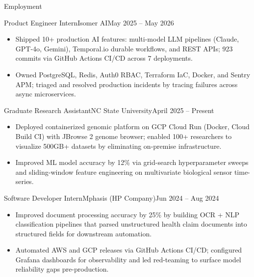 \documentclass[]{mcdowellcv}
\begin{document}
\makeheader

\begin{cvsection}{Employment}
  \begin{cvsubsection}{Product Engineer Intern}{Isomer AI}{May 2025 -- May 2026}
    \begin{itemize}
      \item Shipped 10+ production AI features: multi-model LLM pipelines (Claude, GPT-4o, Gemini), Temporal.io durable workflows, and REST APIs; 923 commits via GitHub Actions CI/CD across 7 deployments.
      \item Owned PostgreSQL, Redis, Auth0 RBAC, Terraform IaC, Docker, and Sentry APM; triaged and resolved production incidents by tracing failures across async microservices.
    \end{itemize}
    \vspace{-1.5pt}
  \end{cvsubsection}

  \begin{cvsubsection}{Graduate Research Assistant}{NC State University}{April 2025 -- Present}
    \begin{itemize}
      \item Deployed containerized genomic platform on GCP Cloud Run (Docker, Cloud Build CI) with JBrowse 2 genome browser; enabled 100+ researchers to visualize 500GB+ datasets by eliminating on-premise infrastructure.
      \item Improved ML model accuracy by 12\% via grid-search hyperparameter sweeps and sliding-window feature engineering on multivariate biological sensor time-series.
    \end{itemize}
    \vspace{-1.5pt}
  \end{cvsubsection}

  \begin{cvsubsection}{Software Developer Intern}{Mphasis (HP Company)}{Jun 2024 -- Aug 2024}
    \begin{itemize}
      \item Improved document processing accuracy by 25\% by building OCR + NLP classification pipelines that parsed unstructured health claim documents into structured fields for downstream automation.
      \item Automated AWS and GCP releases via GitHub Actions CI/CD; configured Grafana dashboards for observability and led red-teaming to surface model reliability gaps pre-production.
    \end{itemize}
    \vspace{-1.5pt}
  \end{cvsubsection}


\end{cvsection}
\end{document}
